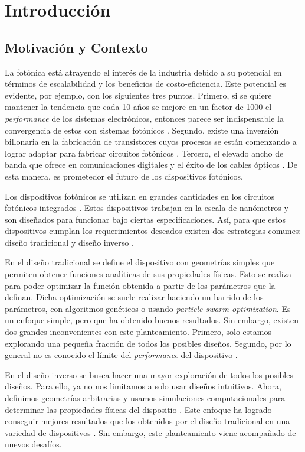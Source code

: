 \chapter{Introducción}

\section{Motivación y Contexto}

La fotónica está atrayendo el interés de la industria debido a su potencial en términos de escalabilidad y los beneficios de costo-eficiencia. 
Este potencial es evidente, por ejemplo, con los siguientes tres puntos. 
Primero, si se quiere mantener la tendencia que cada 10 años se mejore en un factor de 1000 el \emph{performance} de los sistemas electrónicos, entonces parece ser indispensable la convergencia de estos con sistemas fotónicos \cite{Glick2018}. 
Segundo, existe una inversión billonaria en la fabricación de transistores cuyos procesos se están comenzando a lograr adaptar para fabricar circuitos fotónicos \cite{LukasChrostowski2010}.
Tercero, el elevado ancho de banda que ofrece en comunicaciones digitales y el éxito de los cables ópticos \cite{LukasChrostowski2010, Glick2018}.
De esta manera, es prometedor el futuro de los dispositivos fotónicos.

Los dispositivos fotónicos se utilizan en grandes cantidades en los circuitos fotónicos integrados \cite{LukasChrostowski2010}. 
Estos dispositivos trabajan en la escala de nanómetros y son diseñados para funcionar bajo ciertas especificaciones. 
Así, para que estos dispositivos cumplan los requerimientos deseados existen dos estrategias comunes: diseño tradicional y diseño inverso \cite{Molesky2018}.


En el diseño tradicional se define el dispositivo con geometrías simples que permiten obtener funciones analíticas de sus propiedades físicas. 
Esto se realiza para poder optimizar la función obtenida a partir de los parámetros que la definan. Dicha optimización se suele realizar haciendo
un barrido de los parámetros, con algoritmos genéticos o usando \emph{particle swarm optimization}. Es un enfoque simple, pero que ha obtenido
buenos resultados. Sin embargo, existen dos grandes inconvenientes con este planteamiento. 
Primero, solo estamos explorando una pequeña fracción de todos los posibles diseños.
Segundo, por lo general no es conocido el límite del \emph{performance} del dispositivo \cite{Molesky2018, Su2020}.


En el diseño inverso se busca hacer una mayor exploración de todos los posibles diseños. 
Para ello, ya no nos limitamos a solo usar diseños intuitivos. Ahora, definimos geometrías arbitrarias y usamos simulaciones computacionales para determinar las propiedades físicas del dispositio \cite{Molesky2018, Su2020}. Este enfoque ha logrado conseguir mejores resultados que los obtenidos por el diseño tradicional en una variedad de dispositivos \cite{Su2018, Molesky2018}. Sin embargo, este planteamiento viene acompañado de nuevos desafíos.


